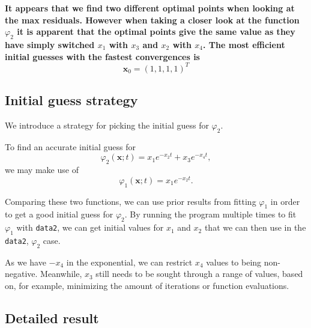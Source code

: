 \documentclass[12pt, a4paper]{article}
\newcommand{\bx}{{\boldsymbol{x}}}
\begin{document}
\textbf{It appears that we find two different optimal points when looking at the max residuals. However when taking a closer look at the function $\varphi_2$ it is apparent that the optimal points give the same value as they have simply switched $x_1$ with $x_3$ and $x_2$ with $x_4$. The most efficient initial guesses with the fastest convergences is}
\[\bx_0={(1,1,1,1)}^T \] 

\subsection{Initial guess strategy}

We introduce a strategy for picking the initial guess for $\varphi_2.$ 

To find an accurate initial guess for \[\varphi_2(\bx;t)=x_1e^{-x_2t}+x_3e^{-x_4t},\] we may make use of \[\varphi_1(\bx;t)=x_1e^{-x_2t}.\] 

Comparing these two functions, we can use prior results from fitting $\varphi_1$ in order to get a good initial guess for $\varphi_2$. By running the program multiple times to fit $\varphi_1$ with \texttt{data2}, we can get initial values for $x_1$ and $x_2$ that we can then use in the \texttt{data2}, $\varphi_2$ case.

As we have $-x_4$ in the exponential, we can restrict $x_4$ values to being non-negative. Meanwhile, $x_3$ still needs to be sought through a range of values, based on, for example, minimizing the amount of iterations or function evaluations.

\subsection{Detailed result}
\end{document}
